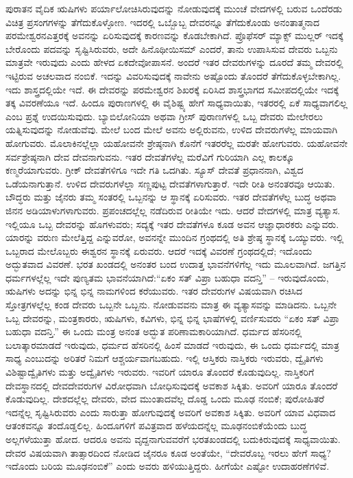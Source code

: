 ಪುರಾತನ ವೈದಿಕ ಋಷಿಗಳು ಪರ್ಯಾಲೋಚಿಸಿರುವುದನ್ನು ನೋಡುವುದಕ್ಕೆ ಮುಂಚೆ ವೇದಗಳಲ್ಲಿ ಬರುವ ಒಂದೆರಡು ವಿಚಿತ್ರ ಪ್ರಸಂಗಗಳನ್ನು ತೆಗೆದುಕೊಳ್ಳೋಣ. ಇದರಲ್ಲಿ ಒಬ್ಬೊಬ್ಬ ದೇವರನ್ನೂ ತೆಗೆದುಕೊಂಡು ಅನಂತಾತ್ಮನಾದ ಪರಮೇಶ್ವರನ\break ಎತ್ತರಕ್ಕೆ ಅವನನ್ನು ಏರಿಸುವುದಕ್ಕೆ ಕಾರಣವನ್ನು ಕೊಡಬೇಕಾಗಿದೆ. ಪ್ರೊಫೆಸರ್‌ ಮ್ಯಾಕ್ಸ್ ಮುಲ್ಲರ್ ಇದಕ್ಕೆ ಬೇರೊಂದು ಪದವನ್ನು ಸೃಷ್ಟಿಸಿರುವರು, ಅದೇ ಹಿನೊಥೀಯಿಸಮ್  ಎಂದರೆ, ತಾನು ಉಪಾಸಿಸುವ ದೇವರು ಒಬ್ಬನು ಮಾತ್ರವೇ ಇರುವುದು ಎಂದು ಹೇಳದ ಏಕದೇವೋಪಾಸನೆ. ಅಂದರೆ ಇತರ ದೇವರುಗಳನ್ನು ದೂರದೆ ತಮ್ಮ ದೇವರಲ್ಲಿ ಇಟ್ಟಿರುವ ಅಚಲವಾದ ನಂಬಿಕೆ. ಇದನ್ನು ವಿವರಿಸುವುದಕ್ಕೆ ನಾವೇನು ಅಷ್ಟೊಂದು ತೊಂದರೆ ತೆಗೆದುಕೊಳ್ಳಬೇಕಾಗಿಲ್ಲ. ಇದು ಶಾಸ್ತ್ರದಲ್ಲಿಯೇ ಇದೆ. ಈ ದೇವರನ್ನು ಪರಮೇಶ್ವರನ ಶಿಖರಕ್ಕೆ ಏರಿಸಿದ ಶಾಸ್ತ್ರಭಾಗದ ಸಮೀಪದಲ್ಲಿಯೇ ಇದಕ್ಕೆ ತಕ್ಕ ವಿವರಣೆಯೂ ಇದೆ. ಹಿಂದೂ ಪುರಾಣಗಳಲ್ಲಿ ಈ ವೈಶಿಷ್ಟ್ಯ ಹೇಗೆ ಸಾಧ್ಯವಾಯಿತು, ಇತರರಲ್ಲಿ ಏಕೆ ಸಾಧ್ಯವಾಗಲಿಲ್ಲ ಎಂಬ ಪ್ರಶ್ನೆ ಉದಯಿಸುವುದು. ಬ್ಯಾಬಿಲೋನಿಯಾ ಅಥವಾ ಗ್ರೀಸ್ ಪುರಾಣಗಳಲ್ಲಿ ಒಬ್ಬ ದೇವರು ಮೇಲೇರಲು ಯತ್ನಿಸುವುದನ್ನು ನೋಡುವೆವು. ಮೇಲೆ ಬಂದ ಮೇಲೆ ಅವನು ಅಲ್ಲಿರುವನು, ಉಳಿದ ದೇವರುಗಳೆಲ್ಲ ಮಾಯವಾಗಿ ಹೋಗುವರು. ಮೊಲಾಕಿನಲ್ಲೆಲ್ಲಾ ಯಹೋವನೇ ಶ್ರೇಷ್ಠನಾಗಿ ಕೊನೆಗೆ ಇತರರೆಲ್ಲ ಮರತೇ ಹೋಗುವರು. ಯಹೋವನೇ ಸರ್ವಶ್ರೇಷ್ಠನಾಗಿ ದೇವ ದೇವನಾಗುವನು. ಇತರ ದೇವತೆಗಳೆಲ್ಲ ಮರೆವಿಗೆ ಗುರಿಯಾಗಿ ಎಲ್ಲ ಕಾಲಕ್ಕೂ ಕಣ್ಮರೆಯಾಗುವರು. ಗ್ರೀಕ್ ದೇವತೆಗಳಿಗೂ ಇದೇ ಗತಿ ಒದಗಿತು. ಸ್ಯೂಸ್ ದೇವತೆ ಪ್ರಧಾನನಾಗಿ, ವಿಶ್ವದ ಒಡೆಯನಾಗುತ್ತಾನೆ. ಉಳಿದ ದೇವರುಗಳೆಲ್ಲಾ ಸಣ್ಣಪುಟ್ಟ ದೇವತೆಗಳಾಗುತ್ತಾರೆ. ಇದೇ ರೀತಿ ಅನಂತರವೂ ಆಯಿತು. ಬೌದ್ಧರು ಮತ್ತು ಜೈನರು ತಮ್ಮ ಸಂತರಲ್ಲಿ ಒಬ್ಬನನ್ನು ಆ ಸ್ಥಾನಕ್ಕೆ ಏರಿಸುವರು. ಇತರ ದೇವತೆಗಳೆಲ್ಲ ಬುದ್ಧ ಅಥವಾ ಜಿನನ ಅಡಿಯಾಳುಗಳಾಗುವರು. ಪ್ರಪಂಚದಲ್ಲೆಲ್ಲ ನಡೆದಿರುವ ರೀತಿಯೇ ಇದು. ಆದರೆ ವೇದಗಳಲ್ಲಿ ಮಾತ್ರ ವ್ಯತ್ಯಾಸ. ಇಲ್ಲಿಯೂ ಒಬ್ಬ ದೇವರನ್ನು ಹೊಗಳುವರು; ಸದ್ಯಕ್ಕೆ ಇತರ ದೇವತೆಗಳೂ ಕೂಡ ಅವನ ಆಜ್ಞಾಧಾರಕರು ಎನ್ನುವರು. ಯಾರನ್ನು ವರುಣ ಮೇಲೆತ್ತಿದ್ದ ಎನ್ನುವರೋ, ಅವನನ್ನೇ ಮುಂದಿನ ಗ್ರಂಥದಲ್ಲಿ ಅತಿ ಶ್ರೇಷ್ಠ ಸ್ಥಾನಕ್ಕೆ ಒಯ್ಯುವರು. ಇಲ್ಲಿ ಒಬ್ಬರಾದ ಮೇಲೊಬ್ಬರು ಈಶ್ವರನ ಸ್ಥಾನಕ್ಕೆ ಏರುವರು. ಆದರೆ ಇದಕ್ಕೆ ವಿವರಣೆ ಗ್ರಂಥದಲ್ಲಿದೆ; ಇದೊಂದು ಅದ್ಭುತವಾದ ವಿವರಣೆ. ಭರತ ಖಂಡದಲ್ಲಿ ಅನಂತರ ಬಂದ ಉದಾತ್ತ ಭಾವನೆಗಳಿಗೆಲ್ಲ ಇದು ಮೂಲವಾಗಿದೆ. ಜಗತ್ತಿನ ಧರ್ಮಗಳಲ್ಲೆಲ್ಲ ಇದೇ ಪುಣ್ಯತಮ ಭಾವನೆಯಾಗಿದೆ:\break “ಏಕಂ ಸತ್ ವಿಪ್ರಾ ಬಹುಧಾ ವದನ್ತಿ” – ಇರುವುದೊಂದು, ಋಷಿಗಳು ಅದನ್ನು ಭಿನ್ನ ಭಿನ್ನ ನಾಮಗಳಿಂದ ಕರೆಯುವರು. ಇತರ ದೇವರುಗಳ ವಿಷಯವಾಗಿ ರಚಿಸಿದ ಸ್ತೋತ್ರಗಳಲ್ಲೆಲ್ಲ ಕಂಡ ದೇವರು ಒಬ್ಬನೇ ಒಬ್ಬನು. ನೋಡುವವನು ಮಾತ್ರ ಈ ವ್ಯತ್ಯಾಸವನ್ನು ಮಾಡಿದನು. ಒಬ್ಬನೇ ಒಬ್ಬ ದೇವರನ್ನು, ಮಂತ್ರಕಾರರು, ಋಷಿಗಳು, ಕವಿಗಳು, ಭಿನ್ನ ಭಿನ್ನ ಭಾಷೆಗಳಲ್ಲಿ ವರ್ಣಿಸುವರು “ಏಕಂ ಸತ್ ವಿಪ್ರಾ ಬಹುಧಾ ವದನ್ತಿ.'' ಈ ಒಂದು ಮಂತ್ರ ಅನಂತ ಅದ್ಭುತ ಪರಿಣಾಮಕಾರಿಯಾಗಿದೆ. ಧರ್ಮದ ಹೆಸರಿನಲ್ಲಿ ಬಲಾತ್ಕಾರಮಾಡದೆ ಇರುವುದು, ಧರ್ಮದ ಹೆಸರಿನಲ್ಲಿ ಹಿಂಸೆ ಮಾಡದೆ ಇರುವುದು, ಈ ಒಂದು ಧರ್ಮದಲ್ಲಿ ಮಾತ್ರ ಸಾಧ್ಯ ಎಂಬುದನ್ನು ಅರಿತರೆ ನಿಮಗೆ ಆಶ್ಚರ್ಯವಾಗಬಹುದು. ಇಲ್ಲಿ ಆಸ್ತಿಕರು ನಾಸ್ತಿಕರು ಇರುವರು, ದ್ವೈತಿಗಳು ವಿಶಿಷ್ಟಾದ್ವೈತಿಗಳು ಮತ್ತು ಅದ್ವೈತಿಗಳು ಇರುವರು. ಇವರಿಗೆ ಯಾರೂ ತೊಂದರೆ ಕೊಡುವುದಿಲ್ಲ. ನಾಸ್ತಿಕರಿಗೆ ದೇವಸ್ಥಾನದಲ್ಲಿ ದೇವದೇವರುಗಳ ವಿರೋಧವಾಗಿ ಬೋಧಿಸುವುದಕ್ಕೆ ಅವಕಾಶ ಸಿಕ್ಕಿತು. ಅವರಿಗೆ ಯಾರೂ ತೊಂದರೆ ಕೊಡುವುದಿಲ್ಲ. ದೇಶದಲ್ಲೆಲ್ಲ ದೇವರು, ವೇದ ಮುಂತಾದವೆಲ್ಲ ದೊಡ್ಡ ಒಂದು ಮೂಢ ನಂಬಿಕೆ; ಪುರೋಹಿತರೆ ಇದನ್ನೆಲ್ಲ ಸೃಷ್ಟಿಸಿರುವರು ಎಂದು ಸಾರುತ್ತಾ ಹೋಗುವುದಕ್ಕೆ ಅವರಿಗೆ ಅವಕಾಶ ಸಿಕ್ಕಿತು. ಅವರಿಗೆ ಯಾವ ವಿಧವಾದ ಆತಂಕವನ್ನೂ ತಂದೊಡ್ಡಲಿಲ್ಲ. ಹಿಂದೂಗಳಿಗೆ ಪವಿತ್ರವಾದ ಹಳೆಯದನ್ನೆಲ್ಲ ಮೂಢನಂಬಿಕೆಯೆಂದು ಬುದ್ಧ ಅಲ್ಲಗಳೆಯುತ್ತಾ ಹೋದ. ಆದರೂ ಅವನು ವೃದ್ದನಾಗುವವರೆಗೆ ಭರತಖಂಡದಲ್ಲಿ ಬದುಕಿರುವುದಕ್ಕೆ ಸಾಧ್ಯವಾಯಿತು. ದೇವರ ವಿಷಯವಾಗಿ ತಾತ್ಸಾರದಿಂದ ನೋಡಿದ ಜೈನರೂ ಕೂಡ ಅಂತೆಯೇ, “ದೇವರೊಬ್ಬ ಇರಲು ಹೇಗೆ ಸಾಧ್ಯ? ಇದೊಂದು ಬರಿಯ ಮೂಢನಂಬಿಕೆ'' ಎಂದು ಅವರು ಹಳಿಯುತ್ತಿದ್ದರು. ಹೀಗೆಯೇ ಎಷ್ಟೋ ಉದಾಹರಣೆಗಳಿವೆ.

